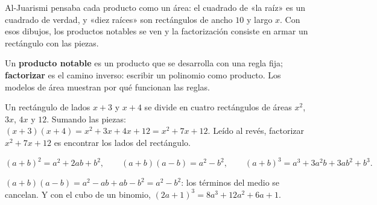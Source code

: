 \documentclass[11pt]{article}
\begin{document}
\label{tema:factorizacion}

\begin{hilo}
Al-Juarismi pensaba cada producto como un área: el cuadrado de «la raíz» es
un cuadrado de verdad, y «diez raíces» son rectángulos de ancho $10$ y largo
$x$. Con esos dibujos, los productos notables se ven y la factorización
consiste en armar un rectángulo con las piezas.
\end{hilo}

Un \textbf{producto notable} es un producto que se desarrolla con una regla
fija; \textbf{factorizar} es el camino inverso: escribir un polinomio como
producto. Los modelos de área muestran por qué funcionan las reglas.

\begin{ejemplo}
Un rectángulo de lados $x + 3$ y $x + 4$ se divide en cuatro rectángulos de
áreas $x^2$, $3x$, $4x$ y $12$. Sumando las piezas:
$(x + 3)(x + 4) = x^2 + 3x + 4x + 12 = x^2 + 7x + 12$. Leído al revés,
factorizar $x^2 + 7x + 12$ es encontrar los lados del rectángulo.

\begin{center}
\end{center}
\end{ejemplo}

\begin{teorema}
\[
  (a + b)^2 = a^2 + 2ab + b^2, \qquad
  (a + b)(a - b) = a^2 - b^2, \qquad
  (a + b)^3 = a^3 + 3a^2b + 3ab^2 + b^3.
\]
\end{teorema}

\begin{ejemplo}
$(a + b)(a - b) = a^2 - ab + ab - b^2 = a^2 - b^2$: los términos del medio se
cancelan. Y con el cubo de un binomio,
$(2a + 1)^3 = 8a^3 + 12a^2 + 6a + 1$.
\end{ejemplo}
\end{document}
